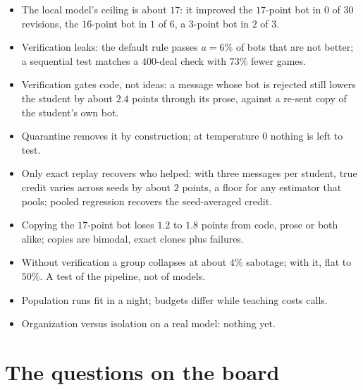 \documentclass[11pt]{article}
\numberwithin{theorem}{section}
\theoremstyle{definition}
\begin{document}
\begin{itemize}[leftmargin=1.2em]
\item {} The local model's ceiling is about $17$: it improved the $17$-point bot in $0$ of $30$
revisions, the $16$-point bot in $1$ of $6$, a $3$-point bot in $2$ of $3$.
\item {} Verification leaks: the default rule passes $a=6\%$ of bots that are not better; a
sequential test matches a $400$-deal check with $73\%$ fewer games.
\item {} Verification gates code, not ideas: a message whose bot is rejected still lowers the
student by
about $2.4$ points through its prose, against a re-sent copy of the student's own bot.
\item {} Quarantine removes it by construction; at temperature $0$ nothing is left to test.
\item {} Only exact replay recovers who helped: with three messages per student, true credit
varies across
seeds by about $2$ points, a floor for any estimator that pools; pooled regression recovers the seed-averaged credit.
\item {} Copying the $17$-point bot loses $1.2$ to $1.8$ points from code, prose or both alike;
copies are
bimodal, exact clones plus failures.
\item {} Without verification a group collapses at about $4\%$ sabotage; with it, flat to
$50\%$. A
test of the pipeline, not of models.
\item {} Population runs fit in a night; budgets differ while teaching costs calls.
\item Organization versus isolation on a real model: nothing yet.
\end{itemize}

\section{The questions on the board}\label{sec:questions}
\end{document}
